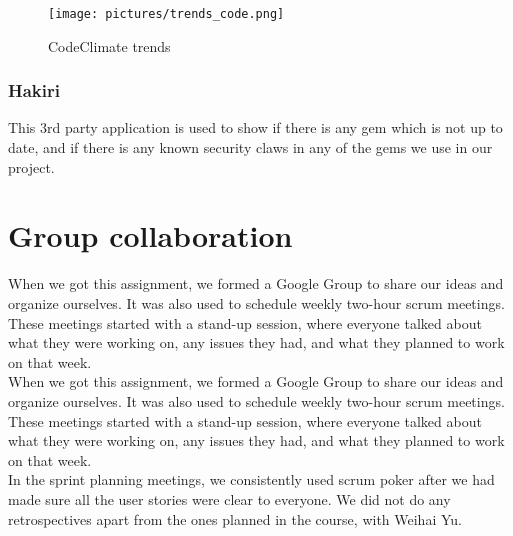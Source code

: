 \documentclass[a4paper]{article}
\begin{document}
\begin{figure}
  \begin{center}
    \texttt{[image: pictures/trends\_code.png]}
    \caption{CodeClimate trends}
    \label{fig:codeclimate}
  \end{center}
\end{figure}

\subsubsection{Hakiri}
This 3rd party application is used to show if there is any gem which is not up to date, and if there is any known security claws in any of the gems we use in our project.




\section{Group collaboration}
When we got this assignment, we formed a Google Group to share our ideas and organize ourselves. It was also used to schedule weekly two-hour scrum meetings. These meetings started with a stand-up session, where everyone talked about what they were working on, any issues they had, and what they planned to work on that week.\\

When we got this assignment, we formed a Google Group to share our ideas and organize ourselves. It was also used to schedule weekly two-hour scrum meetings. These meetings started with a stand-up session, where everyone talked about what they were working on, any issues they had, and what they planned to work on that week.\\

\noindent
In the sprint planning meetings, we consistently used scrum poker after we had made sure all the user stories were clear to everyone. We did not do any retrospectives apart from the ones planned in the course, with Weihai Yu.\\
\end{document}
